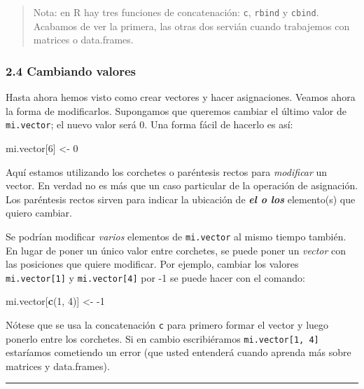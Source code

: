 \documentclass[]{article}
\newenvironment{Shaded}{}{}
\newcommand{\KeywordTok}[1]{\textcolor[rgb]{0.00,0.44,0.13}{\textbf{{#1}}}}
\newcommand{\DecValTok}[1]{\textcolor[rgb]{0.25,0.63,0.44}{{#1}}}
\newcommand{\NormalTok}[1]{{#1}}
\begin{document}
\begin{quote}
Nota: en R hay tres funciones de concatenación: \texttt{c},
\texttt{rbind} y \texttt{cbind}. Acabamos de ver la primera, las otras
dos servián cuando trabajemos con matrices o data.frames.

\end{quote}
\subsubsection{2.4 Cambiando valores}

Hasta ahora hemos visto como crear vectores y hacer asignaciones. Veamos
ahora la forma de modificarlos. Supongamos que queremos cambiar el
último valor de \texttt{mi.vector}; el nuevo valor será 0. Una forma
fácil de hacerlo es así:

\begin{Shaded}
\begin{Highlighting}[]
\NormalTok{mi.vector[}\DecValTok{6}\NormalTok{] <- }\DecValTok{0}
\end{Highlighting}
\end{Shaded}
Aquí estamos utilizando los corchetes o paréntesis rectos para
\emph{modificar} un vector. En verdad no es más que un caso particular
de la operación de asignación. Los paréntesis rectos sirven para indicar
la ubicación de \emph{\textbf{el o los}} elemento(s) que quiero cambiar.

Se podrían modificar \emph{varios} elementos de \texttt{mi.vector} al
mismo tiempo también. En lugar de poner un único valor entre corchetes,
se puede poner un \emph{vector} con las posiciones que quiere modificar.
Por ejemplo, cambiar los valores \texttt{mi.vector{[}1{]}} y
\texttt{mi.vector{[}4{]}} por -1 se puede hacer con el comando:

\begin{Shaded}
\begin{Highlighting}[]
\NormalTok{mi.vector[}\KeywordTok{c}\NormalTok{(}\DecValTok{1}\NormalTok{, }\DecValTok{4}\NormalTok{)] <- -}\DecValTok{1}
\end{Highlighting}
\end{Shaded}
Nótese que se usa la concatenación \texttt{c} para primero formar el
vector y luego ponerlo entre los corchetes. Si en cambio escribiéramos
\texttt{mi.vector{[}1, 4{]}} estaríamos cometiendo un error (que usted
entenderá cuando aprenda más sobre matrices y data.frames).

\begin{center}\rule{3in}{0.4pt}\end{center}
\end{document}
